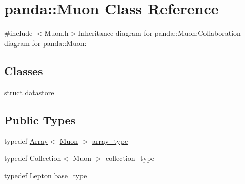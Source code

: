 \hypertarget{classpanda_1_1Muon}{
\section{panda::Muon Class Reference}
\label{classpanda_1_1Muon}
}


{\ttfamily \#include $<$Muon.h$>$}Inheritance diagram for panda::Muon:Collaboration diagram for panda::Muon:\subsection*{Classes}
\begin{DoxyCompactItemize}
\item 
struct \hyperlink{structpanda_1_1Muon_1_1datastore}{datastore}
\end{DoxyCompactItemize}
\subsection*{Public Types}
\begin{DoxyCompactItemize}
\item 
typedef \hyperlink{classpanda_1_1Array}{Array}$<$ \hyperlink{classpanda_1_1Muon}{Muon} $>$ \hyperlink{classpanda_1_1Muon_a03903de481ebc3c6db1d7d979ba99691}{array\_\-type}
\item 
typedef \hyperlink{classpanda_1_1Collection}{Collection}$<$ \hyperlink{classpanda_1_1Muon}{Muon} $>$ \hyperlink{classpanda_1_1Muon_a74e005c403745217b3e67bd6709ccea3}{collection\_\-type}
\item 
typedef \hyperlink{classpanda_1_1Lepton}{Lepton} \hyperlink{classpanda_1_1Muon_a071b288ec091c14f1fe42db77ef7821e}{base\_\-type}
\end{DoxyCompactItemize}
